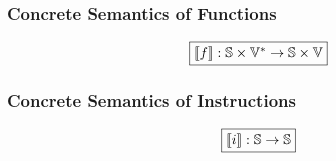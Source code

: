 \subsubsection{Concrete Semantics of Functions}

\[
  \framebox{$\sem{\func}: \stset \times \valset^* \rightarrow \stset \times
  \valset$}
\]

\todo

\subsubsection{Concrete Semantics of Instructions}

\[
  \framebox{$\sem{\inst}: \stset \rightarrow \stset$}
\]

\todo
% 
% 
% 
% 
% 
% 
% 
% 

